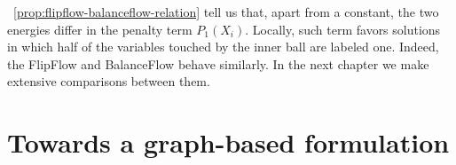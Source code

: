 ~\cref{prop:flipflow-balanceflow-relation} tell us that, apart  from a constant, the two energies differ in the penalty term $P_1(X_i)$. Locally, such term favors solutions in which half of the variables touched by the inner ball are labeled one. Indeed, the FlipFlow and BalanceFlow behave similarly. In the next chapter we make extensive comparisons between them.


\section{Towards a graph-based formulation}

%
%
%
%

